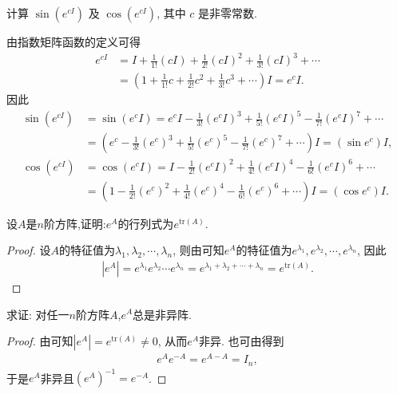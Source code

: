\documentclass[../../main.tex]{subfiles}
\begin{document}
\begin{example}
计算 $\sin(e^{cI})$ 及 $\cos(e^{cI})$, 其中 $c$ 是非零常数.
\end{example}
\begin{solution}
由指数矩阵函数的定义可得
\begin{align*}
e^{cI}&=I+\frac{1}{1!}(cI)+\frac{1}{2!}(cI)^2+\frac{1}{3!}(cI)^3+\cdots\\
&=\left( 1+\frac{1}{1!}c+\frac{1}{2!}c^2+\frac{1}{3!}c^3+\cdots \right) I = e^cI.
\end{align*}
因此
\begin{align*}
\sin(e^{cI})&=\sin(e^cI)=e^cI-\frac{1}{3!}(e^cI)^3+\frac{1}{5!}(e^cI)^5-\frac{1}{7!}(e^cI)^7+\cdots\\
&=\left( e^c-\frac{1}{3!}(e^c)^3+\frac{1}{5!}(e^c)^5-\frac{1}{7!}(e^c)^7+\cdots \right) I = (\sin e^c)I,\\
\cos(e^{cI})&=\cos(e^cI)=I-\frac{1}{2!}(e^cI)^2+\frac{1}{4!}(e^cI)^4-\frac{1}{6!}(e^cI)^6+\cdots\\
&=\left( 1-\frac{1}{2!}(e^c)^2+\frac{1}{4!}(e^c)^4-\frac{1}{6!}(e^c)^6+\cdots \right) I = (\cos e^c)I. 
\end{align*} 
\end{solution}

\begin{proposition}\label{proposition:矩阵函数e^A的行列式}
设$A$是$n$阶方阵,证明:$e^A$的行列式为$e^{\mathrm{tr}(A)}$.
\end{proposition}
\begin{proof}
设$A$的特征值为$\lambda_1,\lambda_2,\cdots,\lambda_n$, 则由可知$e^A$的特征值为$e^{\lambda_1},e^{\lambda_2},\cdots,e^{\lambda_n}$, 因此
\begin{align*}
|e^A| = e^{\lambda_1}e^{\lambda_2}\cdots e^{\lambda_n}=e^{\lambda_1 + \lambda_2 + \cdots + \lambda_n}=e^{\mathrm{tr}(A)}.
\end{align*} 
\end{proof}

\begin{corollary}
求证: 对任一$n$阶方阵$A$,$e^A$总是非异阵.
\end{corollary}
\begin{proof}
由可知$|e^A| = e^{\mathrm{tr}(A)}\neq 0$, 从而$e^A$非异. 也可由得到
\begin{align*}
e^Ae^{-A}=e^{A - A}=I_n,
\end{align*}
于是$e^A$非异且$(e^A)^{-1}=e^{-A}$. 
\end{proof}
\end{document}
